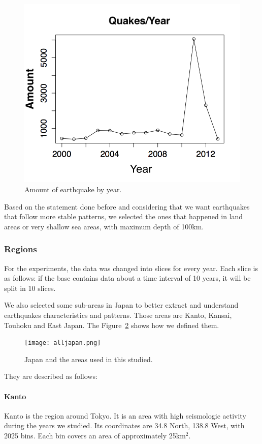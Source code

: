 \begin{figure}[!htb]
\centering
\includegraphics[scale=0.5]{img/ocorrenciasAno.png}
\caption{Amount of earthquake by year.}
\label{ocorrenciasAno}
\end{figure}

Based on the statement done before and considering that we want earthquakes that follow more stable patterns, we selected the ones that happened in land areas or very shallow sea areas, with maximum depth of 100km.

\subsubsection{Regions}
For the experiments, the data was changed into slices for every year. Each slice is as follows: if the base contains data about a time interval of 10 years, it will be split in 10 slices.

We also selected some sub-areas in Japan to better extract and understand earthquakes characteristics and patterns. Those areas are Kanto, Kansai, Touhoku and East Japan. The Figure~\ref{alljapan} shows how we defined them. 

\begin{figure}[H]
	\centering
	\texttt{[image: alljapan.png]}
	\caption{Japan and the areas used in this studied.}
	\label{alljapan}
\end{figure}


They are described as follows:

\paragraph{Kanto} Kanto is the region around Tokyo. It is an area with high seismologic activity during the years we studied. Its coordinates are 34.8 North, 138.8 West, with  2025 bins. Each bin covers an area of approximately 25km$^2$.

